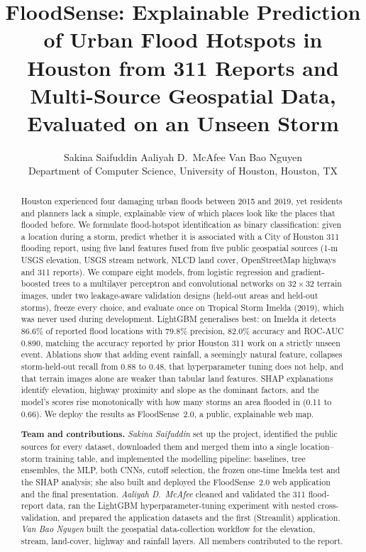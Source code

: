 \documentclass{article}
\title{FloodSense: Explainable Prediction of Urban Flood Hotspots in Houston from 311 Reports and Multi-Source Geospatial Data, Evaluated on an Unseen Storm}
\author{%
  Sakina Saifuddin \And Aaliyah D.\ McAfee \And Van Bao Nguyen \\
  Department of Computer Science, University of Houston, Houston, TX
}
\begin{document}
\maketitle

\begin{abstract}
Houston experienced four damaging urban floods between 2015 and 2019, yet residents and planners lack a simple, explainable view of which places look like the places that flooded before. We formulate flood-hotspot identification as binary classification: given a location during a storm, predict whether it is associated with a City of Houston 311 flooding report, using five land features fused from five public geospatial sources (1-m USGS elevation, USGS stream network, NLCD land cover, OpenStreetMap highways and 311 reports). We compare eight models, from logistic regression and gradient-boosted trees to a multilayer perceptron and convolutional networks on $32\times32$ terrain images, under two leakage-aware validation designs (held-out areas and held-out storms), freeze every choice, and evaluate once on Tropical Storm Imelda (2019), which was never used during development. LightGBM generalises best: on Imelda it detects 86.6\% of reported flood locations with 79.8\% precision, 82.0\% accuracy and ROC-AUC 0.890, matching the accuracy reported by prior Houston 311 work on a strictly unseen event. Ablations show that adding event rainfall, a seemingly natural feature, collapses storm-held-out recall from 0.88 to 0.48, that hyperparameter tuning does not help, and that terrain images alone are weaker than tabular land features. SHAP explanations identify elevation, highway proximity and slope as the dominant factors, and the model's scores rise monotonically with how many storms an area flooded in (0.11 to 0.66). We deploy the results as FloodSense~2.0, a public, explainable web map.

\textbf{Team and contributions.} \emph{Sakina Saifuddin} set up the project, identified the public sources for every dataset, downloaded them and merged them into a single location--storm training table, and implemented the modelling pipeline: baselines, tree ensembles, the MLP, both CNNs, cutoff selection, the frozen one-time Imelda test and the SHAP analysis; she also built and deployed the FloodSense~2.0 web application and the final presentation. \emph{Aaliyah D.\ McAfee} cleaned and validated the 311 flood-report data, ran the LightGBM hyperparameter-tuning experiment with nested cross-validation, and prepared the application datasets and the first (Streamlit) application. \emph{Van Bao Nguyen} built the geospatial data-collection workflow for the elevation, stream, land-cover, highway and rainfall layers. All members contributed to the report.
\end{abstract}
\end{document}
